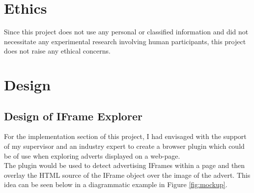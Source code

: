 \documentclass[12pt]{article}
\begin{document}
\section{Ethics}
Since this project does not use any personal or classified information and did not necessitate any experimental research involving human participants, this project does not raise any ethical concerns. 

\pagebreak

\section{Design}

\subsection{Design of IFrame Explorer}
For the implementation section of this project, I had envisaged with the support of my supervisor and an industry expert to create a browser plugin which could be of use when exploring adverts displayed on a web-page.  \\

The plugin would be used to detect advertising IFrames within a page and then overlay the HTML source of the IFrame object over the image of the advert. This idea can be seen below in a diagrammatic example in Figure \ref{fig:mockup}. 
\end{document}
